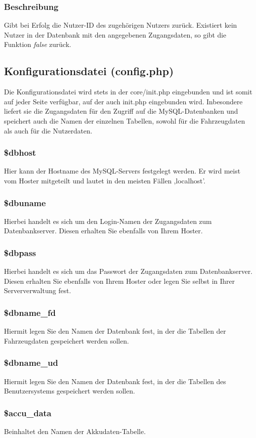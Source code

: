 \documentclass[fontsize = 12pt, paper = a4]{scrreprt}
\begin{document}
\subsubsection*{Beschreibung}
Gibt bei Erfolg die Nutzer-ID des zugehörigen Nutzers zurück. Existiert kein Nutzer in der Datenbank mit den angegebenen Zugangsdaten, so gibt die Funktion \textit{false} zurück.

\newpage
\subsection{Konfigurationsdatei (config.php)}
Die Konfigurationsdatei wird stets in der core/init.php eingebunden und ist somit auf jeder Seite verfügbar, auf der auch init.php eingebunden wird. Inbesondere liefert sie die Zugangsdaten für den Zugriff auf die MySQL-Datenbanken und speichert auch die Namen der einzelnen Tabellen, sowohl für die Fahrzeugdaten als auch für die Nutzerdaten.
\subsubsection*{\$dbhost}
Hier kann der Hostname des MySQL-Servers festgelegt werden. Er wird meist vom Hoster mitgeteilt und lautet in den meisten Fällen ,localhost'.
\subsubsection*{\$dbuname}
Hierbei handelt es sich um den Login-Namen der Zugangsdaten zum Datenbankserver. Diesen erhalten Sie ebenfalls von Ihrem Hoster.
\subsubsection*{\$dbpass}
Hierbei handelt es sich um das Passwort der Zugangsdaten zum Datenbankserver. Diesen erhalten Sie ebenfalls von Ihrem Hoster oder legen Sie selbst in Ihrer Serververwaltung fest.
\subsubsection*{\$dbname\_fd}
Hiermit legen Sie den Namen der Datenbank fest, in der die Tabellen der Fahrzeugdaten gespeichert werden sollen.
\subsubsection*{\$dbname\_ud}
Hiermit legen Sie den Namen der Datenbank fest, in der die Tabellen des Benutzersystems gespeichert werden sollen.
\subsubsection*{\$accu\_data}
Beinhaltet den Namen der Akkudaten-Tabelle.
\end{document}
